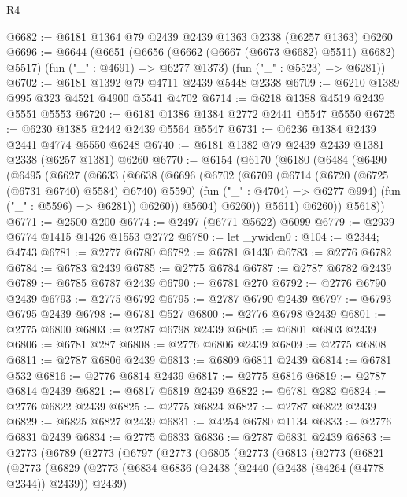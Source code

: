 \begin{lexlean}{R4}
\begin{coremodule}
@6682 := @6181 @1364 @79 @2439 @2439 @1363 @2338 (@6257 @1363) @6260
@6696 := @6644
    (@6651
      (@6656 (@6662 (@6667 (@6673 @6682) @5511) @6682) @5517)
      (fun ("_" : @4691) => @6277 @1373)
      (fun ("_" : @5523) => @6281))
@6702 := @6181 @1392 @79 @4711 @2439 @5448 @2338
@6709 := @6210 @1389 @995 @323 @4521 @4900 @5541 @4702
@6714 := @6218 @1388 @4519 @2439 @5551 @5553
@6720 := @6181 @1386 @1384 @2772 @2441 @5547 @5550
@6725 := @6230 @1385 @2442 @2439 @5564 @5547
@6731 := @6236 @1384 @2439 @2441 @4774 @5550 @6248
@6740 := @6181 @1382 @79 @2439 @2439 @1381 @2338 (@6257 @1381) @6260
@6770 := @6154
    (@6170
      (@6180
        (@6484
          (@6490
            (@6495
              (@6627
                (@6633
                  (@6638
                    (@6696
                      (@6702
                        (@6709
                          (@6714 (@6720 (@6725 (@6731 @6740) @5584) @6740) @5590)
                          (fun ("_" : @4704) => @6277 @994)
                          (fun ("_" : @5596) => @6281))
                        @6260))
                    @5604)
                  @6260))
              @5611)
            @6260))
        @5618))
@6771 := @2500 @200
@6774 := @2497 (@6771 @5622) @6099
@6779 := @2939 @6774 @1415 @1426 @1553 @2772
@6780 := let _ywiden0 : @104 := @2344; @4743
@6781 := @2777 @6780
@6782 := @6781 @1430
@6783 := @2776 @6782
@6784 := @6783 @2439
@6785 := @2775 @6784
@6787 := @2787 @6782 @2439
@6789 := @6785 @6787 @2439
@6790 := @6781 @270
@6792 := @2776 @6790 @2439
@6793 := @2775 @6792
@6795 := @2787 @6790 @2439
@6797 := @6793 @6795 @2439
@6798 := @6781 @527
@6800 := @2776 @6798 @2439
@6801 := @2775 @6800
@6803 := @2787 @6798 @2439
@6805 := @6801 @6803 @2439
@6806 := @6781 @287
@6808 := @2776 @6806 @2439
@6809 := @2775 @6808
@6811 := @2787 @6806 @2439
@6813 := @6809 @6811 @2439
@6814 := @6781 @532
@6816 := @2776 @6814 @2439
@6817 := @2775 @6816
@6819 := @2787 @6814 @2439
@6821 := @6817 @6819 @2439
@6822 := @6781 @282
@6824 := @2776 @6822 @2439
@6825 := @2775 @6824
@6827 := @2787 @6822 @2439
@6829 := @6825 @6827 @2439
@6831 := @4254 @6780 @1134
@6833 := @2776 @6831 @2439
@6834 := @2775 @6833
@6836 := @2787 @6831 @2439
@6863 := @2773
    (@6789
      (@2773
        (@6797
          (@2773
            (@6805
              (@2773
                (@6813
                  (@2773
                    (@6821
                      (@2773
                        (@6829
                          (@2773
                            (@6834
                              @6836
                              (@2438 (@2440 (@2438 (@4264 (@4778 @2344)) @2439)) @2439)

\end{coremodule}
\end{lexlean}
